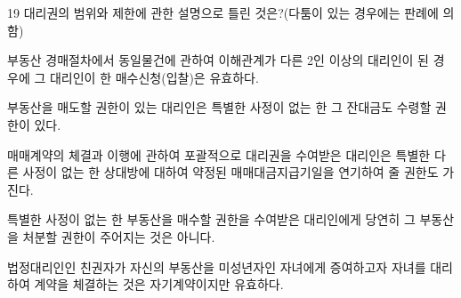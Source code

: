 \begin{question}{19}
대리권의 범위와 제한에 관한 설명으로 틀린 것은?(다툼이 있는 경우에는 판례에 의함)
\begin{choices}
  \item 부동산 경매절차에서 동일물건에 관하여 이해관계가 다른 2인 이상의 대리인이 된 경우에 그 대리인이 한 매수신청(입찰)은 유효하다.
  \item 부동산을 매도할 권한이 있는 대리인은 특별한 사정이 없는 한 그 잔대금도 수령할 권한이 있다.
  \item 매매계약의 체결과 이행에 관하여 포괄적으로 대리권을 수여받은 대리인은 특별한 다른 사정이 없는 한 상대방에 대하여 약정된 매매대금지급기일을 연기하여 줄 권한도 가진다.
  \item 특별한 사정이 없는 한 부동산을 매수할 권한을 수여받은 대리인에게 당연히 그 부동산을 처분할 권한이 주어지는 것은 아니다.
  \item 법정대리인인 친권자가 자신의 부동산을 미성년자인 자녀에게 증여하고자 자녀를 대리하여 계약을 체결하는 것은 자기계약이지만 유효하다.
\end{choices}
\end{question}
